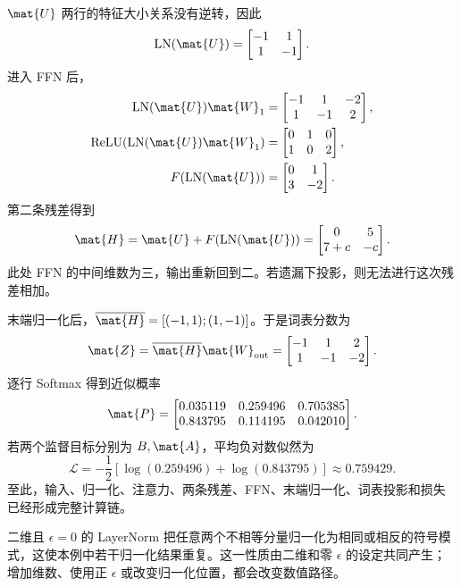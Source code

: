 \documentclass[../textbook.tex]{subfiles}
\begin{document}
\begin{example}
$\mat{U}$ 两行的特征大小关系没有逆转，因此
\begin{equation*}
 \operatorname{LN}(\mat{U})=\begin{bmatrix}-1&1\\1&-1\end{bmatrix}.
\end{equation*}
进入 FFN 后，
\begin{align*}
 \operatorname{LN}(\mat{U})\mat{W}_1&=\begin{bmatrix}-1&1&-2\\1&-1&2\end{bmatrix},\\
 \operatorname{ReLU}(\operatorname{LN}(\mat{U})\mat{W}_1)&=\begin{bmatrix}0&1&0\\1&0&2\end{bmatrix},\\
 F(\operatorname{LN}(\mat{U}))&=\begin{bmatrix}0&1\\3&-2\end{bmatrix}.
\end{align*}
第二条残差得到
\begin{equation*}
 \mat{H}=\mat{U}+F(\operatorname{LN}(\mat{U}))
 =\begin{bmatrix}0&5\\7+c&-c\end{bmatrix}.
\end{equation*}
此处 FFN 的中间维数为三，输出重新回到二。若遗漏下投影，则无法进行这次残差相加。

末端归一化后，$\overline{\mat{H}}=[(-1,1);(1,-1)]$。于是词表分数为
\begin{equation*}
 \mat{Z}=\overline{\mat{H}} \mat{W}_{\mathrm{out}}=
 \begin{bmatrix}-1&1&2\\1&-1&-2\end{bmatrix}.
\end{equation*}
逐行 Softmax 得到近似概率
\begin{equation*}
 \mat{P}=\begin{bmatrix}
 0.035119&0.259496&0.705385\\
 0.843795&0.114195&0.042010
 \end{bmatrix}.
\end{equation*}
若两个监督目标分别为 $B,\mat{A}$，平均负对数似然为
\begin{equation*}
 \mathcal L=-\frac12[\log(0.259496)+\log(0.843795)]\approx0.759429.
\end{equation*}
至此，输入、归一化、注意力、两条残差、FFN、末端归一化、词表投影和损失已经形成完整计算链。

二维且 $\epsilon=0$ 的 LayerNorm 把任意两个不相等分量归一化为相同或相反的符号模式，这使本例中若干归一化结果重复。这一性质由二维和零 $\epsilon$ 的设定共同产生；增加维数、使用正 $\epsilon$ 或改变归一化位置，都会改变数值路径。
\end{example}
\end{document}
